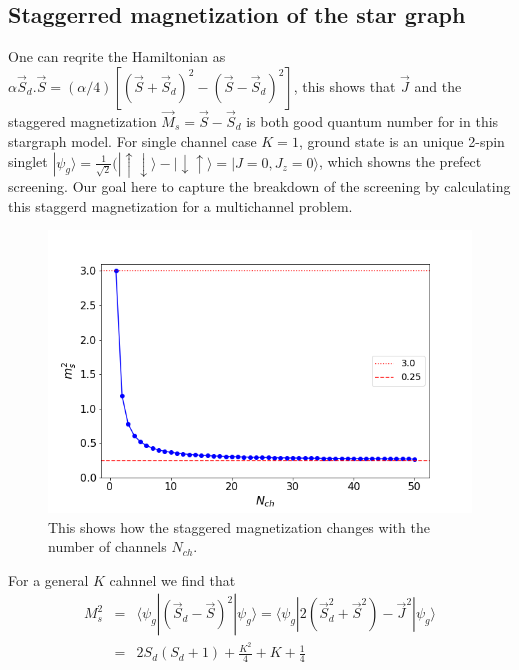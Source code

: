 \documentclass[reprint,prb,superscriptaddress]{revtex4-2}
\begin{document}
\subsection{Staggerred magnetization of the star graph}
\noindent  One can reqrite the Hamiltonian as $\alpha \vec{S}_d.\vec{S}=(\alpha/4) [( \vec{S}+\vec{S}_d)^2-( \vec{S}-\vec{S}_d)^2]$, this shows that $\vec{J}$ and the staggered magnetization $\vec{M}_s=\vec{S}-\vec{S}_d$ is both good quantum number for in this stargraph model. For single channel case $K=1$, ground state is an unique 2-spin singlet $|\psi_g\rangle =\frac{1}{\sqrt{2}} (|\uparrow\downarrow\rangle-|\downarrow\uparrow\rangle = |J=0,J_z=0\rangle$, which showns the prefect screening. Our goal here to capture the breakdown of the screening by calculating this staggerd magnetization for a multichannel problem. 
\begin{figure}
\includegraphics[scale=0.36]{plt/Staggered_mag_50.png}
\caption{This shows how the staggered magnetization changes with the number of channels $N_{ch}$.}
\label{fig:st_mag}
\end{figure}
%
%
%
For a general $K$ cahnnel we find that 
\begin{eqnarray}
M_s^2 &=& \langle \psi_g | (\vec{S}_d - \vec{S})^2 |\psi_g\rangle = \langle \psi_g | 2(\vec{S}_d^2 + \vec{S}^2)-\vec{J}^2 |\psi_g\rangle \nonumber\\
&=& 2S_d(S_d+1) +\frac{K^2}{4} + K +\frac{1}{4}
\end{eqnarray}
\end{document}
